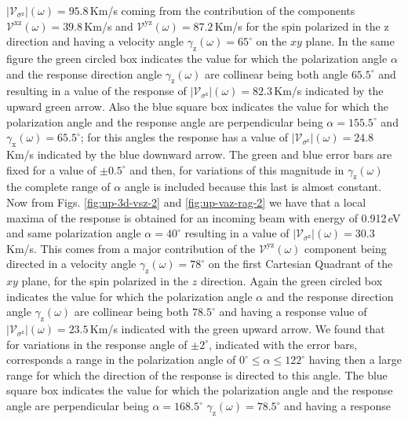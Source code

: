 \documentclass[prb,11pt,tightenlines,twocolumn,aps]{revtex4-1}
\begin{document}
$|\mathcal{V}_{\sigma^{\mathrm{z}}}|(\omega)=95.8$\,Km/s coming from the
contribution of the components $\mathcal{V}^{\mathrm{xz}}(\omega)=39.8$\,Km/s
and $\mathcal{V}^{\mathrm{yz}}(\omega)=87.2$\,Km/s for the spin polarized in the
$\mathrm{z}$ direction and having a velocity angle
$\gamma_{\mathrm{z}}(\omega)=65^{\circ}$ on the $xy$ plane.
% 
In the same figure the green circled box indicates the value for which the
polarization angle $\alpha$ and the response direction angle
$\gamma_{\mathrm{z}}(\omega)$ are collinear being both angle $65.5^{\circ}$ and
resulting in a value of the response of
$|\mathcal{V}_{\sigma^{\mathrm{z}}}|(\omega)=82.3$\,Km/s indicated by the upward
green arrow.
% 
Also the blue square box indicates the value for which the polarization angle
and the response angle are perpendicular being $\alpha=155.5^{\circ}$ and
$\gamma_{\mathrm{x}}(\omega)=65.5^{\circ}$; for this angles the response has a
value of $|\mathcal{V}_{\sigma^{\mathrm{z}}}|(\omega)=24.8$\,Km/s indicated by
the blue downward arrow.
% 
The green and blue error bars are fixed for a value of $\pm0.5^{\circ}$ and
then, for variations of this magnitude in $\gamma_{\mathrm{z}}(\omega)$ the
complete range of $\alpha$ angle is included because this last is almost
constant.
% 
Now from Figs. \ref{fig:up-3d-vsz-2} and \ref{fig:up-vaz-rag-2} we have that a
local maxima of the response is obtained for an incoming beam with energy of
0.912\,eV and same polarization angle $\alpha=40^{\circ}$ resulting in a value
of $|\mathcal{V}_{\sigma^{\mathrm{z}}}|(\omega)=30.3$\,Km/s. This comes from a
major contribution of the $\mathcal{V}^{\mathrm{yz}}(\omega)$ component being
directed in a velocity angle $\gamma_{\mathrm{z}}(\omega)=78^{\circ}$ on the
first Cartesian Quadrant of the $xy$ plane, for the spin polarized in the $z$
direction.
% 
Again the green circled box indicates the value for which the polarization angle
$\alpha$ and the response direction angle $\gamma_{\mathrm{z}}(\omega)$ are
collinear being both $78.5^{\circ}$ and having a response value of
$|\mathcal{V}_{\sigma^{\mathrm{z}}}|(\omega)=23.5$\,Km/s indicated with the
green upward arrow. We found that for variations in the response angle of $\pm
2^{\circ}$, indicated with the error bars, corresponds a range in the
polarization angle of $0^{\circ} \leq \alpha \leq 122^{\circ}$ having then a
large range for which the direction of the response is directed to this angle.
% 
The blue square box indicates the value for which the polarization angle and the
response angle are perpendicular being $\alpha=168.5^{\circ}$
$\gamma_{\mathrm{z}}(\omega)=78.5^{\circ}$ and having a response
\end{document}
